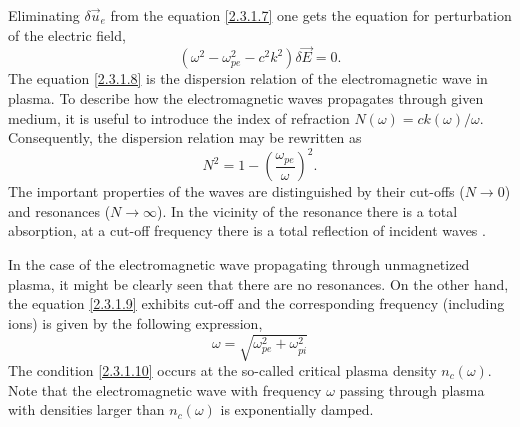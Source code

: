Eliminating $ \delta \vec{u}_{e} $ from the equation \ref{2.3.1.7} one gets the equation for perturbation of the electric field,
\begin{equation}
\label{2.3.1.8}
\left(\omega^2 - \omega_{pe}^2 - c^2 k^2 \right) \delta \vec{E} = 0. 
\end{equation}
The equation \ref{2.3.1.8} is the dispersion relation of the electromagnetic wave in plasma. To describe how the electromagnetic waves propagates through given medium, it is useful to introduce the index of refraction $ N \left( \omega \right) =  c k \left( \omega \right) / \omega $. Consequently, the dispersion relation may be rewritten as
\begin{equation}
\label{2.3.1.9}
N^{2} = 1 - \left(\frac{\omega_{pe}}{\omega}\right)^2.
\end{equation} 
The important properties of the waves are distinguished by their cut-offs ($ N \rightarrow 0 $) and resonances ($ N \rightarrow \infty $). In the vicinity of the resonance there is a total absorption, at a cut-off frequency there is a total reflection of incident waves \cite{kruer}.

In the case of the electromagnetic wave propagating through unmagnetized plasma, it might be clearly seen that there are no resonances. On the other hand, the equation \ref{2.3.1.9} exhibits cut-off and the corresponding frequency (including ions) is given by the following expression,
\begin{equation}
\label{2.3.1.10}
\omega = \sqrt{\omega_{pe}^{2} + \omega_{pi}^{2}}
\end{equation}
The condition \ref{2.3.1.10} occurs at the so-called critical plasma density $ n_c \left( \omega\right) $. Note that the electromagnetic wave with frequency $ \omega $ passing through plasma with densities larger than $ n_c \left( \omega\right) $ is exponentially damped.